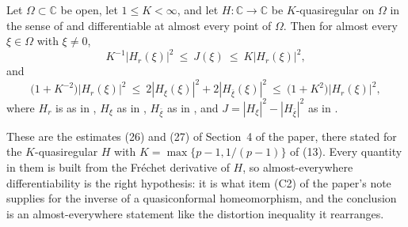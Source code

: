 \begin{lemma}
Let $\Omega\subset\mathbb{C}$ be open, let $1\le K<\infty$, and let
$H\colon\mathbb{C}\to\mathbb{C}$ be $K$-quasiregular on $\Omega$ in the sense
of  and differentiable at almost every point of
$\Omega$.  Then for almost every $\xi\in\Omega$ with $\xi\neq0$,
\begin{equation*}\tag{26}
  K^{-1}|H_r(\xi)|^2\ \le\ J(\xi)\ \le\ K|H_r(\xi)|^2,
\end{equation*}
and
\begin{equation*}\tag{27}
  \bigl(1+K^{-2}\bigr)|H_r(\xi)|^2
  \ \le\ 2|H_\xi(\xi)|^2+2|H_{\bar\xi}(\xi)|^2
  \ \le\ \bigl(1+K^{2}\bigr)|H_r(\xi)|^2,
\end{equation*}
where $H_r$ is as in , $H_\xi$ as in ,
$H_{\bar\xi}$ as in , and
$J=|H_\xi|^2-|H_{\bar\xi}|^2$ as in .

These are the estimates (26) and (27) of Section~4 of the paper, there stated
for the $K$-quasiregular $H$ with $K=\max\{p-1,1/(p-1)\}$ of (13).  Every
quantity in them is built from the Fr\'echet derivative of $H$, so
almost-everywhere differentiability is the right hypothesis: it is what item
(C2) of the paper's note supplies for the inverse of a quasiconformal
homeomorphism, and the conclusion is an almost-everywhere statement like the
distortion inequality it rearranges.
\end{lemma}
